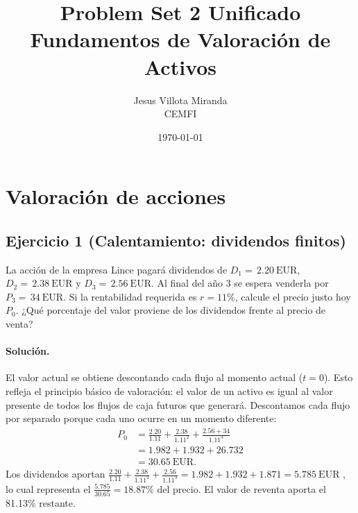 \documentclass[12pt,a4paper]{article}
\title{\textbf{Problem Set 2 Unificado}\\\large Fundamentos de Valoración de Activos}
\author{Jesus Villota Miranda\\CEMFI}
\date{\today}
\newcommand{\EUR}[1]{\ensuremath{#1~\text{EUR}}}
\newenvironment{ejercicio}[1]{\subsection*{Ejercicio #1}}{}
\newenvironment{solucion}{\paragraph{Solución.}}{}
\begin{document}



\section{Valoración de acciones}

\begin{ejercicio}{1 (Calentamiento: dividendos finitos)}
La acción de la empresa Lince pagará dividendos de $D_1=\,\EUR{2.20}$, $D_2=\,\EUR{2.38}$ y $D_3=\,\EUR{2.56}$. Al final del año 3 se espera venderla por $P_3=\,\EUR{34}$. Si la rentabilidad requerida es $r=11\%$, calcule el precio justo hoy $P_0$. ¿Qué porcentaje del valor proviene de los dividendos frente al precio de venta?
\end{ejercicio}
\begin{solucion}
El valor actual se obtiene descontando cada flujo al momento actual ($t=0$). Esto refleja el principio básico de valoración: el valor de un activo es igual al valor presente de todos los flujos de caja futuros que generará. Descontamos cada flujo por separado porque cada uno ocurre en un momento diferente:
\begin{align*}
P_0 &= \frac{2.20}{1.11} + \frac{2.38}{1.11^2} + \frac{2.56 + 34}{1.11^3}\\
    &= 1.982 + 1.932 + 26.732 
    \\ &= \EUR{30.65}.
\end{align*}
Los dividendos aportan 
$
\frac{2.20}{1.11} + \frac{2.38}{1.11^2} + \frac{2.56}{1.11^3} = 1.982 + 1.932 + 1.871 = \EUR{5.785}
$
, lo cual representa el $\frac{5.785}{30.65} = 18.87\%$ del precio. El valor de reventa aporta el 81.13\% restante.
\end{solucion}
\end{document}
